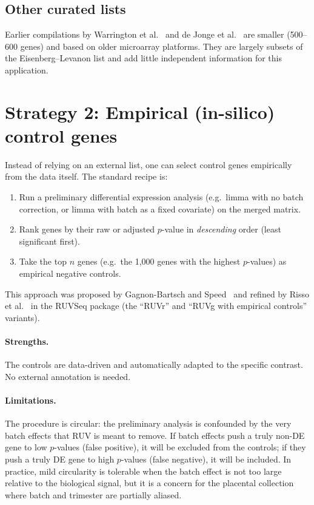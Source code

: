 \documentclass[11pt,a4paper]{article}
\begin{document}
\subsection{Other curated lists}

Earlier compilations by Warrington et al.~\cite{warrington2000} and
de Jonge et al.~\cite{dejonge2007} are smaller (500--600 genes) and
based on older microarray platforms.  They are largely subsets of the
Eisenberg--Levanon list and add little independent information for
this application.


\section{Strategy 2: Empirical (in-silico) control genes}

Instead of relying on an external list, one can select control genes
empirically from the data itself.  The standard recipe is:

\begin{enumerate}
  \item Run a preliminary differential expression analysis (e.g.\
        limma with no batch correction, or limma with batch as a fixed
        covariate) on the merged matrix.
  \item Rank genes by their raw or adjusted $p$-value in
        \emph{descending} order (least significant first).
  \item Take the top $n$ genes (e.g.\ the 1{,}000 genes with the
        highest $p$-values) as empirical negative controls.
\end{enumerate}

This approach was proposed by Gagnon-Bartsch and
Speed~\cite{gagnonbartsch2012} and refined by
Risso et al.~\cite{risso2014} in the RUVSeq package (the ``RUVr''
and ``RUVg with empirical controls'' variants).

\paragraph{Strengths.}
The controls are data-driven and automatically adapted to the specific
contrast.  No external annotation is needed.

\paragraph{Limitations.}
The procedure is circular: the preliminary analysis is confounded by
the very batch effects that RUV is meant to remove.  If batch effects
push a truly non-DE gene to low $p$-values (false positive), it will be
excluded from the controls; if they push a truly DE gene to high
$p$-values (false negative), it will be included.  In practice, mild
circularity is tolerable when the batch effect is not too large
relative to the biological signal, but it is a concern for the
placental collection where batch and trimester are partially aliased.
\end{document}
